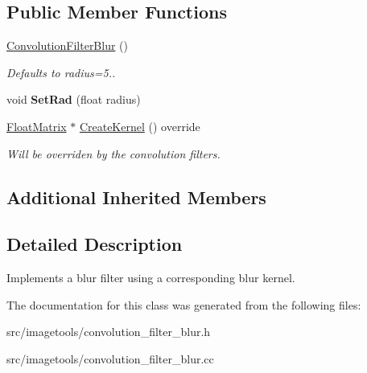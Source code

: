 \subsection*{Public Member Functions}
\begin{DoxyCompactItemize}
\item 
\mbox{\label{classimage__tools_1_1ConvolutionFilterBlur_a8b00c3c274763a4f9cd67a0a18d544e8}} 
\hyperlink{classimage__tools_1_1ConvolutionFilterBlur_a8b00c3c274763a4f9cd67a0a18d544e8}{Convolution\+Filter\+Blur} ()
\begin{DoxyCompactList}\small\item\em Defaults to radius=5.. \end{DoxyCompactList}\item 
\mbox{\label{classimage__tools_1_1ConvolutionFilterBlur_a2f809172d1b0ea253ac9259db4d7acba}} 
void {\bfseries Set\+Rad} (float radius)
\item 
\mbox{\label{classimage__tools_1_1ConvolutionFilterBlur_a310546bd12dcc8894f0af414677b2b07}} 
\hyperlink{classimage__tools_1_1FloatMatrix}{Float\+Matrix} $\ast$ \hyperlink{classimage__tools_1_1ConvolutionFilterBlur_a310546bd12dcc8894f0af414677b2b07}{Create\+Kernel} () override
\begin{DoxyCompactList}\small\item\em Will be overriden by the convolution filters. \end{DoxyCompactList}\end{DoxyCompactItemize}
\subsection*{Additional Inherited Members}


\subsection{Detailed Description}
Implements a blur filter using a corresponding blur kernel. 

The documentation for this class was generated from the following files\+:\begin{DoxyCompactItemize}
\item 
src/imagetools/convolution\+\_\+filter\+\_\+blur.\+h\item 
src/imagetools/convolution\+\_\+filter\+\_\+blur.\+cc\end{DoxyCompactItemize}

